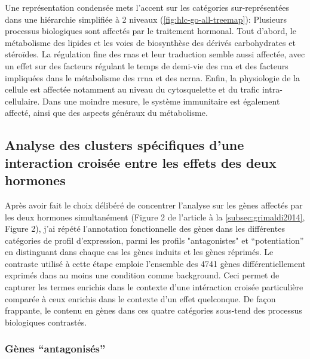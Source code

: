 \documentclass[../main.tex]{subfiles}
\begin{document}


Une représentation condensée mets l'accent sur les catégories sur-représentées dans une hiérarchie simplifiée à 2 niveaux (\autoref{fig:hlc-go-all-treemap}):
Plusieurs processus biologiques sont affectés par le traitement hormonal.
Tout d'abord, le métabolisme des lipides et les voies de biosynthèse des dérivés carbohydrates et stéroïdes.
La régulation fine des \glspl{rna} et leur traduction semble aussi affectée, avec un effet sur des facteurs régulant le temps de demi-vie des \gls{rna} et des facteurs impliquées dans le métabolisme des \gls{rrna} et des \gls{ncrna}.
Enfin, la physiologie de la cellule est affectée notamment au niveau du cytosquelette et du trafic intra-cellulaire.
Dans une moindre mesure, le système immunitaire est également affecté, ainsi que des aspects généraux du métabolisme.




\subsection{Analyse des clusters spécifiques d'une interaction croisée entre les effets des deux hormones}
Après avoir fait le choix délibéré de concentrer l'analyse sur les gènes affectés par les deux hormones simultanément (Figure 2 de l'article à la \autoref{subsec:grimaldi2014}, Figure 2), j'ai répété l'annotation fonctionnelle des gènes dans les différentes catégories de profil d'expression, parmi les profils "antagonistes" et ``potentiation'' en distinguant dans chaque cas les gènes induits et les gènes réprimés.
Le contraste utilisé à cette étape emploie l'ensemble des 4741 gènes différentiellement exprimés dans au moins une condition comme background.
Ceci permet de capturer les termes enrichis dans le contexte d'une intéraction croisée particulière comparée à ceux enrichis dans le contexte d'un effet quelconque.
De façon frappante, le contenu en gènes dans ces quatre catégories sous-tend des processus biologiques contrastés.


\subsubsection{Gènes ``antagonisés''}
\end{document}
